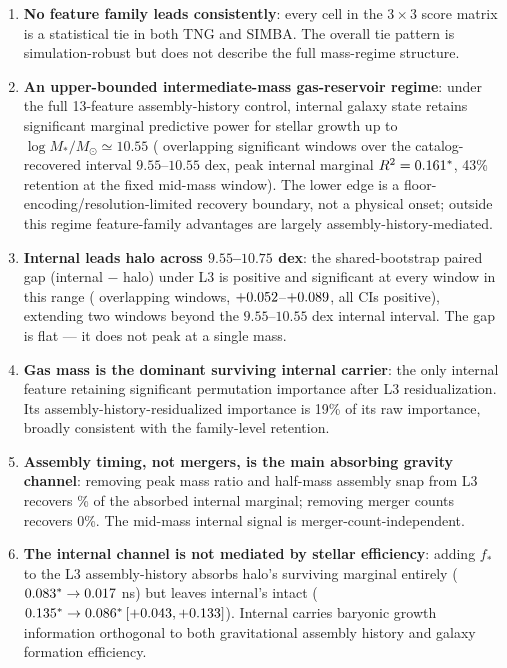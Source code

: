 \documentclass[twocolumn,linenumbers]{aastex701}
\newcommand{\logM}{\log M_*}
\newcommand{\fstar}{f_*}
\begin{document}
\begin{enumerate}
  \item \textbf{No feature family leads consistently}: every cell in the
    $3 \times 3$ score matrix is a statistical tie in both TNG and SIMBA.
    The overall tie pattern is simulation-robust but does not describe the
    full mass-regime structure.

  \item \textbf{An upper-bounded intermediate-mass gas-reservoir regime}:
    under the full 13-feature assembly-history control, internal galaxy state
    retains significant marginal predictive power for stellar growth up to
    $\logM/M_\odot \simeq 10.55$ (\WindowNWindowsL{} overlapping significant
    windows over the catalog-recovered interval $9.55$--$10.55$ dex, peak
    internal marginal $R^2 = 0.161^*$, 43\% retention at the fixed
    mid-mass window). The lower edge is a floor-encoding/resolution-limited
    recovery boundary, not a physical onset; outside this regime feature-family
    advantages are largely assembly-history-mediated.

  \item \textbf{Internal leads halo across $9.55$--$10.75$ dex}: the
    shared-bootstrap paired gap (internal $-$ halo) under L3 is positive and
    significant at every window in this range (\PairedGapNWindows{} overlapping
    windows, $+0.052$--$+0.089$, all CIs positive), extending two
    windows beyond the $9.55$--$10.55$ dex internal interval.
    The gap is flat --- it does not peak at a single mass.

  \item \textbf{Gas mass is the dominant surviving internal carrier}: the
    only internal feature retaining significant permutation importance after
    L3 residualization.
    Its assembly-history-residualized importance is 19\% of its raw
    importance, broadly consistent with the family-level retention.

  \item \textbf{Assembly timing, not mergers, is the main absorbing gravity
    channel}: removing peak mass ratio and half-mass assembly snap from L3
    recovers \AblationTimingPct\% of the absorbed internal marginal;
    removing merger counts recovers 0\%.
    The mid-mass internal signal is merger-count-independent.

  \item \textbf{The internal channel is not mediated by stellar efficiency}:
    adding $\fstar$ to the L3 assembly-history absorbs halo's surviving
    marginal entirely ($0.083^* \to 0.017$ ns) but leaves
    internal's intact ($0.135^* \to 0.086^*\,
    [+0.043, +0.133]$).
    Internal carries baryonic growth information orthogonal to both
    gravitational assembly history and galaxy formation efficiency.


\end{enumerate}
\end{document}
